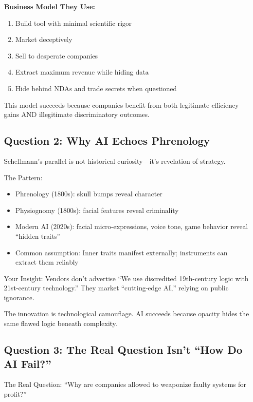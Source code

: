 \documentclass[12pt,letterpaper]{article}
\begin{document}
\textbf{Business Model They Use:}
\begin{enumerate}
\item Build tool with minimal scientific rigor
\item Market deceptively
\item Sell to desperate companies
\item Extract maximum revenue while hiding data
\item Hide behind NDAs and trade secrets when questioned
\end{enumerate}

This model succeeds because companies benefit from both legitimate efficiency gains AND illegitimate discriminatory outcomes.

\subsection{Question 2: Why AI Echoes Phrenology}

Schellmann's parallel is not historical curiosity---it's revelation of strategy.

\begin{keyfindings}
The Pattern:
\begin{itemize}
\item Phrenology (1800s): skull bumps reveal character
\item Physiognomy (1800s): facial features reveal criminality  
\item Modern AI (2020s): facial micro-expressions, voice tone, game behavior reveal ``hidden traits''
\item Common assumption: Inner traits manifest externally; instruments can extract them reliably
\end{itemize}

Your Insight: Vendors don't advertise ``We use discredited 19th-century logic with 21st-century technology.'' They market ``cutting-edge AI,'' relying on public ignorance.
\end{keyfindings}

The innovation is technological camouflage. AI succeeds because opacity hides the same flawed logic beneath complexity.

\subsection{Question 3: The Real Question Isn't ``How Do AI Fail?''}

The Real Question: ``Why are companies allowed to weaponize faulty systems for profit?''
\end{document}
